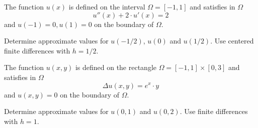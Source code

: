 \begin{teilaufgaben}
\item
The function $u(x)$ is defined on the interval $\Omega = [-1,1]$ and
satisfies in $\Omega$ 
\[
u''(x) + 2 \cdot u'(x) = 2
\]
and $u(-1) = 0, u(1) = 0$ on the boundary of $\Omega$. 

Determine approximate values for $u(-1/2)$, $u(0)$ and $u(1/2)$. 
Use centered finite differences with $h = 1/2$. 
\item
The function $u(x,y)$ is defined on the rectangle
$\Omega = [-1, 1] \times [0,3]$ and satisfies in $\Omega$
\[
\Delta u(x,y) = e^x \cdot y 
\]
and $u(x,y) = 0$ on the boundary of $\Omega$.

Determine approximate values for $u(0,1)$ and $u(0,2)$.
Use finite differences with $h = 1.$
\end{teilaufgaben}


